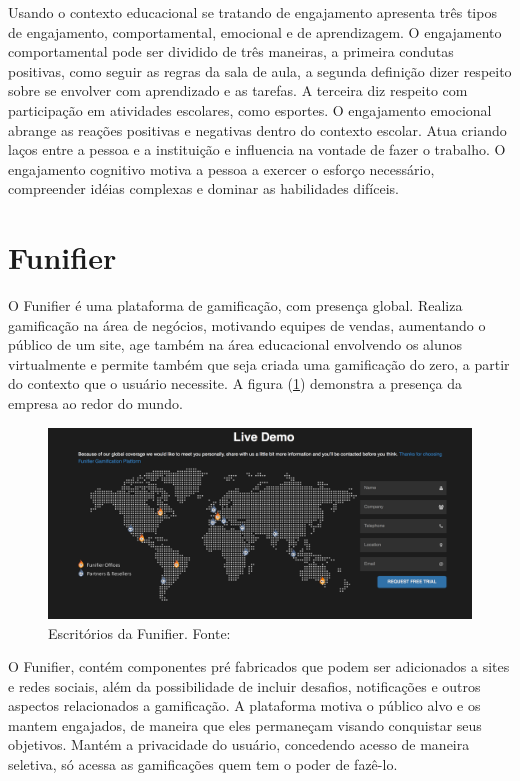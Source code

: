 Usando o contexto educacional se tratando de engajamento \cite{fredericks2004school} apresenta três tipos de engajamento, comportamental, emocional e de aprendizagem.
O engajamento comportamental pode ser dividido de três maneiras, a primeira condutas positivas, como seguir as regras da sala de aula, a segunda definição dizer respeito sobre se envolver com aprendizado e as tarefas. A terceira diz respeito com participação em atividades escolares, como esportes. O engajamento emocional abrange as reações positivas e negativas dentro do contexto escolar. Atua criando laços entre a pessoa e a instituição e influencia na vontade de fazer o trabalho. O engajamento cognitivo  motiva a pessoa a exercer o esforço necessário, compreender idéias complexas e dominar as habilidades difíceis. 

\section{Funifier}

O Funifier é uma plataforma de gamificação, com presença global. Realiza gamificação na área de negócios, motivando equipes de vendas, aumentando o público de um site, age também na área educacional envolvendo os alunos virtualmente e permite também que seja criada uma gamificação do zero, a partir do contexto que o usuário necessite\cite{funifier}. A figura (\ref{globalfig}) demonstra a presença da empresa ao redor do mundo.


\begin{figure}[h]
	\centering
		\includegraphics[keepaspectratio=true,scale=0.3]{figuras/globalfig.png}
	\caption{Escritórios da Funifier. Fonte: \cite{funifier}\label{globalfig}
}
\end{figure}


O Funifier, contém componentes pré fabricados que podem ser adicionados a sites e redes sociais, além da possibilidade de incluir desafios, notificações e outros aspectos relacionados a gamificação. A plataforma motiva o público alvo e os mantem engajados, de maneira que eles permaneçam visando conquistar seus objetivos. Mantém a privacidade do usuário, concedendo acesso de maneira seletiva, só acessa as gamificações quem tem o poder de fazê-lo. 

